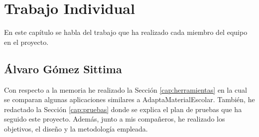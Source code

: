 \chapter{Trabajo Individual}
\label{cap:TrabajoIndividual}

En este capítulo se habla del trabajo que ha realizado cada miembro del equipo en el proyecto.

\section{Álvaro Gómez Sittima}
Con respecto a la memoria he realizado la Sección \ref{cap:herramientas} en la cual se comparan algunas aplicaciones similares a AdaptaMaterialEscolar. También, he redactado la Sección \ref{cap:pruebas} donde se explica el plan de pruebas que ha seguido este proyecto. Además, junto a mis compañeros, he realizado los objetivos, el diseño y la metodología empleada.
